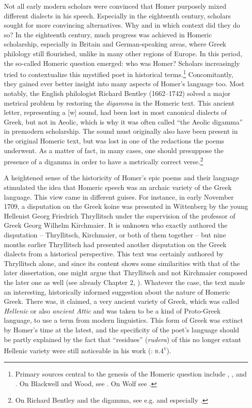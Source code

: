 Not all early modern scholars were convinced that Homer purposely mixed different dialects in his speech. Especially in the eighteenth century, scholars sought for more convincing alternatives. Why and in which context did they do so? In the eighteenth century, much progress was achieved in Homeric scholarship, especially in Britain and German-speaking areas, where Greek philology still flourished, unlike in many other regions of Europe. In this period, the so-called Homeric question emerged: who was Homer? Scholars increasingly tried to contextualize this mystified poet in historical terms.\footnote{Primary sources central to the genesis of the Homeric question include \citet[]{[blackwell]1735}, \citet{Wood1775}, and \citet{Wolf1795}. On Blackwell and Wood, see \citet[90-108]{Bauman2003}. On Wolf see \citet[\textsc{iii.}55–57]{Sandys1908}.} Concomitantly, they gained ever better insight into many aspects of Homer’s language too. Most notably, the English philologist Richard Bentley (1662–1742) solved a major metrical problem by restoring the \textit{digamma} in the Homeric text. This ancient letter, representing a [w] sound, had been lost in most canonical dialects of Greek, but not in Aeolic, which is why it was often called “the Aeolic digamma” in premodern scholarship. The sound must originally also have been present in the original Homeric text, but was lost in one of the redactions the poems underwent. As a matter of fact, in many cases, one should presuppose the presence of a digamma in order to have a metrically correct verse.\footnote{On Richard Bentley and the digamma, see e.g. \citet[\textsc{ii.}407]{Sandys1908} and especially \citet[182-186]{Haugen2011}.}

A heightened sense of the historicity of Homer’s epic poems and their language stimulated the idea that Homeric speech was an archaic variety of the Greek language. This view came in different guises. For instance, in early November 1709, a disputation on the Greek koine was presented in Wittenberg by the young Hellenist Georg Friedrich Thryllitsch under the supervision of the professor of Greek Georg Wilhelm Kirchmaier. It is unknown who exactly authored the disputation – Thryllitsch, Kirchmaier, or both of them together – but nine months earlier Thryllitsch had presented another disputation on the Greek dialects from a historical perspective. This text was certainly authored by Thryllitsch alone, and since its content shows some similarities with that of the later dissertation, one might argue that Thryllitsch and not Kirchmaier composed the later one as well (see already Chapter 2, ). Whatever the case, the text made an interesting, historically informed suggestion about the nature of Homeric Greek. There was, it claimed, a very ancient variety of Greek, which was called \textit{Hellenic} or also \textit{ancient Attic} and was taken to be a kind of Proto-Greek language, to use a term from modern linguistics. This form of Greek was extinct by Homer’s time at the latest, and the specificity of the poet’s language should be partly explained by the fact that “residues” (\textit{rudera}) of this no longer extant Hellenic variety were still noticeable in his work (\citealt{Kirchmaier1709}: \textsc{b.4}\textsc{\textsuperscript{v}}).

